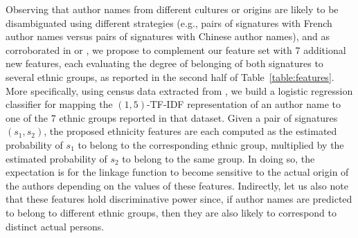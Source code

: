 \documentclass{article}
\begin{document}
Observing that author names from different cultures or origins are likely to be
disambiguated using different strategies (e.g., pairs of signatures with French
author names versus pairs of signatures with Chinese author names), and as
corroborated in \citep{treeratpituk2012name} or \citep{chin2014effective}, we
propose to complement our feature set with 7 additional new features, each
evaluating the degree of belonging of both signatures to several ethnic groups,
as reported in the second half of Table~\ref{table:features}. More
specifically, using census data extracted from \citep{rugglesintegrated}, we
build a logistic regression classifier for mapping the $(1,5)$-TF-IDF
representation of an author name to one of the 7 ethnic groups reported in that
dataset. Given a pair of signatures $(s_1, s_2)$, the proposed ethnicity
features are each computed as the estimated probability of $s_1$ to belong to
the corresponding ethnic group, multiplied by the estimated probability of
$s_2$ to belong to the same group. In doing so, the expectation is for the
linkage function to become sensitive to the actual origin of the authors
depending on the values of these features. Indirectly, let us also note that these
features hold discriminative power since, if author names are predicted
to belong to different ethnic groups, then they are also likely to correspond to
distinct actual persons.
\end{document}
